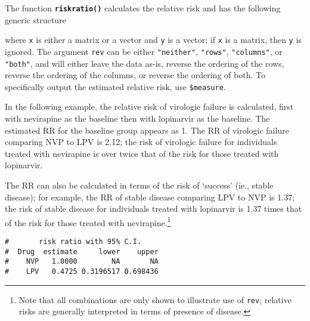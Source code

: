 \documentclass[letterpaper,12pt,twoside,]{pinp}
\begin{document}
\vspace{0.5cm}

The function \textbf{\texttt{riskratio()}} calculates the relative risk
and has the following generic structure

\begin{Shaded}
\begin{Highlighting}[]
 \NormalTok{, } \NormalTok{)}\OperatorTok{$}
\end{Highlighting}
\end{Shaded}

where \texttt{x} is either a matrix or a vector and \texttt{y} is a
vector; if \texttt{x} is a matrix, then \texttt{y} is ignored. The
argument \texttt{rev} can be either \texttt{"neither"}, \texttt{"rows"},
\texttt{"columns"}, or \texttt{"both"}, and will either leave the data
as-is, reverse the ordering of the rows, reverse the ordering of the
columns, or reverse the ordering of both. To specifically output the
estimated relative risk, use \texttt{\$measure}.

In the following example, the relative risk of virologic failure is
calculated, first with nevirapine as the baseline then with lopinarvir
as the baseline. The estimated RR for the baseline group appears as 1.
The RR of virologic failure comparing NVP to LPV is 2.12; the risk of
virologic failure for individuals treated with nevirapine is over twice
that of the risk for those treated with lopinarvir.

The RR can also be calculated in terms of the risk of `success' (ie.,
stable disease); for example, the RR of stable disease comparing LPV to
NVP is 1.37; the risk of stable disease for individuals treated with
lopinarvir is 1.37 times that of the risk for those treated with
nevirapine.\footnote{Note that all combinations are only shown to illustrate use of \texttt{rev}; relative risks are generally interpreted in terms of presence of disease.}

\begin{Shaded}
\begin{Highlighting}[]
\OperatorTok{$}
\end{Highlighting}
\end{Shaded}

\begin{ShadedResult}
\begin{verbatim}
#       risk ratio with 95% C.I.
#  Drug  estimate     lower    upper
#    NVP   1.0000        NA       NA
#    LPV   0.4725 0.3196517 0.698436
\end{verbatim}
\end{ShadedResult}
\end{document}
